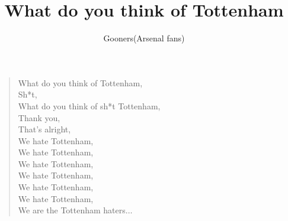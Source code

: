 \documentclass[a4paper,12pt]{article}
\title{What do you think of Tottenham}
\author{Gooners(Arsenal fans)}
\date{}
\begin{document}
	
	\maketitle
	
	\begin{verse}
		
		What do you think of Tottenham, \\
		Sh*t, \\
		What do you think of sh*t Tottenham, \\ 
		Thank you, \\
		That's alright, \\
		We hate Tottenham, \\ 
		We hate Tottenham, \\
		We hate Tottenham, \\
		We hate Tottenham, \\
		We hate Tottenham, \\
		We hate Tottenham, \\
		We are the Tottenham haters$\ldots$
		
	\end{verse}
	
\end{document}
